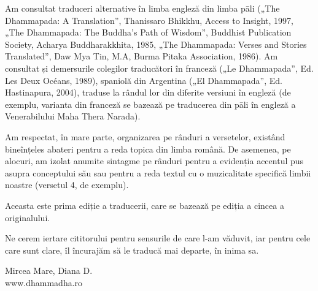Am consultat traduceri alternative în limba engleză din limba pāli („The Dhammapada: A Translation”, Thanissaro Bhikkhu, Access to Insight, 1997, „The Dhammapada: The Buddha's Path of Wisdom”, Buddhist Publication Society, Acharya Buddharakkhita, 1985, „The Dhammapada: Verses and Stories Translated”, Daw Mya Tin, M.A, Burma Pitaka Association, 1986). Am consultat și demersurile colegilor traducători în franceză („Le Dhammapada”, Ed. Les Deux Océans, 1989), spaniolă din Argentina („El Dhammapada”, Ed. Hastinapura, 2004), traduse la rândul lor din diferite versiuni în engleză (de exemplu, varianta din franceză se bazează pe traducerea din pāli în engleză a Venerabilului Maha Thera Narada).

Am respectat, în mare parte, organizarea pe rânduri a versetelor, existând bineînțeles abateri pentru a reda topica din limba română. De asemenea, pe alocuri, am izolat anumite sintagme pe rânduri pentru a evidenția accentul pus asupra conceptului său sau pentru a reda textul cu o
muzicalitate specifică limbii noastre (versetul 4, de exemplu).

Aceasta este prima ediție a traducerii, care se bazează pe ediția a cincea a originalului.

Ne cerem iertare cititorului pentru sensurile de care l-am văduvit, iar pentru cele care sunt clare, îl încurajăm să le traducă mai departe, în inima sa.

\bigskip

{\raggedleft
Mircea Mare, Diana D.\\
www.dhammadha.ro
\par}

